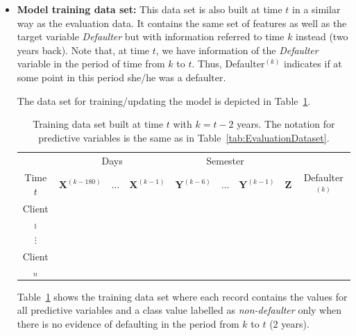 \documentclass{article}
\theoremstyle{theorem}
\theoremstyle{definition}
\newcommand{\X}{\mathbf{X}}
\newcommand{\Y}{\mathbf{Y}}
\newcommand{\Z}{\mathbf{Z}}
\begin{document}
{\begin{itemize}
If, at some point, the probability of default of a customer rises above a predefined threshold, the bank may take preventive actions to reduce the risk of defaulting by this customer.


\item \textbf{Model training data set:}  This data set is also built at time $t$ in a similar way as the evaluation data. It contains the same set of features as well as the target variable \textit{Defaulter} but with information referred to time $k$ instead (two years back). Note that, at time $t$, we have information of the \textit{Defaulter} variable in the period of time from $k$ to $t$. Thus,  Defaulter$^{(k)}$ indicates if at some point in this period she/he was a defaulter.

The data set for training/updating the model is depicted in Table~\ref{tab:TrainingDataset}.
\begin{table}[ht!]
\centering
\begin{tabular}{c|ccc|ccc|c|c}
	&\multicolumn{3}{c|}{Days} & \multicolumn{3}{c|}{Semester} & \\
     Time $t$              & $\X^{(k-180)}$ & $\ldots$ & $\X^{(k-1)} $ & $\Y^{(k-6)}$  & $\ldots$ & $\Y^{(k-1)} $ & $\Z$ & Defaulter$^{(k)}$\\  
\hline
Client$_1$  &                                                  &              &                     &                               &                     &        &  \\ 
$\vdots$      &                                                 &               &                     &                                &                     &       & \\ 
Client$_n$  &                                                &               &                     &                                &                     &     & \\ 
\end{tabular} 
\caption{Training data set built at time $t$ with $k=t - 2$ years.  The notation for predictive variables is the same as in Table~\ref{tab:EvaluationDataset}.}
\label{tab:TrainingDataset} 
\end{table}

Table~\ref{tab:TrainingDataset} shows the training data set where each record contains the values for all predictive variables and a class value labelled as \emph{non-defaulter} only when there is no evidence of defaulting in the period from $k$ to $t$ (2 years). 

\end{itemize}

}
\end{document}
